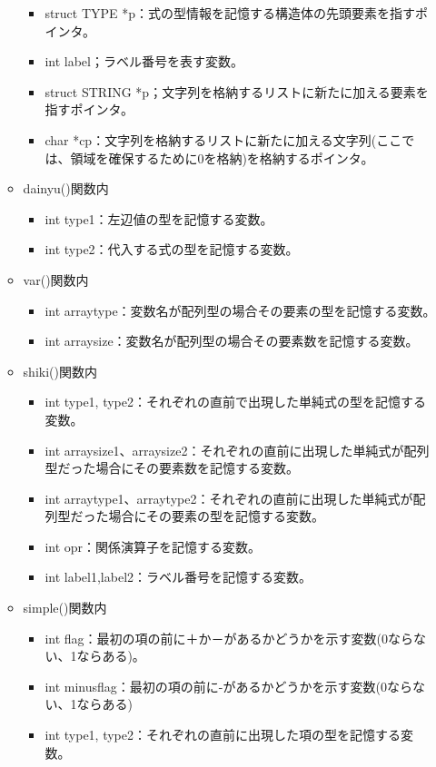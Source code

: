 \documentclass{jarticle}
\begin{document}
\begin{itemize}
\begin{itemize}
\begin{itemize}
      \item struct TYPE *p：式の型情報を記憶する構造体の先頭要素を指すポインタ。
      \item int label；ラベル番号を表す変数。
      \item struct STRING *p；文字列を格納するリストに新たに加える要素を指すポインタ。
      \item char *cp：文字列を格納するリストに新たに加える文字列(ここでは、領域を確保するために0を格納)を格納するポインタ。
    \end{itemize}
    \item dainyu()関数内
    \begin{itemize}
      \item int type1：左辺値の型を記憶する変数。
      \item int type2：代入する式の型を記憶する変数。
    \end{itemize}
    \item var()関数内
    \begin{itemize}
      \item int arraytype：変数名が配列型の場合その要素の型を記憶する変数。
      \item int arraysize：変数名が配列型の場合その要素数を記憶する変数。
    \end{itemize}
    \item shiki()関数内
    \begin{itemize}
      \item int type1, type2：それぞれの直前で出現した単純式の型を記憶する変数。
      \item int
      arraysize1、arraysize2：それぞれの直前に出現した単純式が配列型だった場合にその要素数を記憶する変数。
      \item int
      arraytype1、arraytype2：それぞれの直前に出現した単純式が配列型だった場合にその要素の型を記憶する変数。
      \item int opr：関係演算子を記憶する変数。
      \item int label1,label2：ラベル番号を記憶する変数。
    \end{itemize}
    \item simple()関数内
    \begin{itemize}
      \item int flag：最初の項の前に＋か－があるかどうかを示す変数(0ならない、1ならある)。
      \item int minusflag：最初の項の前に-があるかどうかを示す変数(0ならない、1ならある)
      \item int type1, type2：それぞれの直前に出現した項の型を記憶する変数。

\end{itemize}
\end{itemize}
\end{itemize}
\end{document}
